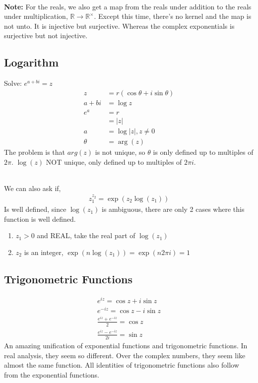 \documentclass{article}
\begin{document}
\noindent \\ \textbf{Note:} For the reals, we also get a map from the reals under addition to the
reals under multiplication, $\mathbb{R} \rightarrow \mathbb{R}^\times$. Except this time, there's
no kernel and the map is not unto. It is injective but surjective. Whereas the complex exponentials
is surjective but not injective.
\subsection{Logarithm}
Solve: $e^{a + bi} = z$
\begin{align*}
	z      & = r(\cos\theta + i\sin\theta) \\
	a + bi & = \log z                      \\
	e^a    & = r                           \\
	       & = |z|                         \\
	a      & = \log|z|, z \neq 0           \\
	\theta & = \arg(z)
\end{align*}
The problem is that $arg(z)$ is not unique, so $\theta$ is only defined
up to multiples of $2\pi$. $\log(z)$ NOT unique, only defined up to multiples
of $2\pi i$.

\noindent \\ We can also ask if,
\begin{gather*}
	z_1^{z_2} = \exp(z_2 \log(z_1))
\end{gather*}
Is well defined, since $\log(z_1)$ is ambiguous, there are only 2 cases where this function is well
defined.
\begin{enumerate}
	\item $z_1 > 0$ and REAL, take the real part of $\log(z_1)$
	\item $z_2$ is an integer, $\exp(n\log(z_1)) = \exp(n2\pi i) = 1$
\end{enumerate}
\subsection{Trigonometric Functions}
\begin{gather*}
	e^{iz} = \cos z + i\sin z \\
	e^{-iz} = \cos z - i\sin z \\
	\frac{e^{iz}+e^{-iz}}{2} = \cos z \\
	\frac{e^{iz}-e^{-iz}}{2i} = \sin z
\end{gather*}
An amazing unification of exponential functions and trigonometric functions. In
real analysis, they seem so different. Over the complex numbers, they seem like
almost the same function. All identities of trigonometric functions also follow
from the exponential functions.
\end{document}

